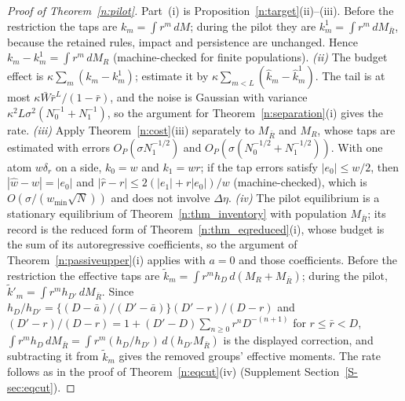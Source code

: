 \documentclass[11pt,letterpaper]{article}
\theoremstyle{definition}
\begin{document}
\begin{proof}[Proof of Theorem~\ref{n:pilot}]
Part~(i) is Proposition~\ref{n:target}(ii)--(iii). Before the restriction the taps are $k_m = \int r^m\, dM$; during the pilot they are $k^1_m = \int r^m\, dM_{\bar R}$, because the retained rules, impact and persistence are unchanged. Hence $k_m - k^1_m = \int r^m\, dM_R$ (machine-checked for finite populations). \emph{(ii)} The budget effect is $\kappa \sum_m (k_m - k^1_m)$; estimate it by $\kappa \sum_{m < L} (\hat k_m - \hat k^1_m)$. The tail is at most $\kappa \bar W \bar r^L / (1 - \bar r)$, and the noise is Gaussian with variance $\kappa^2 L \sigma^2 (N_0^{-1} + N_1^{-1})$, so the argument for Theorem~\ref{n:separation}(i) gives the rate. \emph{(iii)} Apply Theorem~\ref{n:cost}(iii) separately to $M_{\bar R}$ and $M_R$, whose taps are estimated with errors $O_P(\sigma N_1^{-1/2})$ and $O_P(\sigma (N_0^{-1/2} + N_1^{-1/2}))$. With one atom $w\delta_r$ on a side, $k_0 = w$ and $k_1 = w r$; if the tap errors satisfy $|e_0| \le w/2$, then $|\hat w - w| = |e_0|$ and $|\hat r - r| \le 2(|e_1| + r|e_0|)/w$ (machine-checked), which is $O(\sigma/(w_{\min}\sqrt N))$ and does not involve $\Delta\eta$. \emph{(iv)} The pilot equilibrium is a stationary equilibrium of Theorem~\ref{n:thm_inventory} with population $M_{\bar R}$; its record is the reduced form of Theorem~\ref{n:thm_eqreduced}(i), whose budget is the sum of its autoregressive coefficients, so the argument of Theorem~\ref{n:passiveupper}(i) applies with $a = 0$ and those coefficients. Before the restriction the effective taps are $\tilde k_m = \int r^m h_D\, d(M_R + M_{\bar R})$; during the pilot, $\tilde k'_m = \int r^m h_{D'}\, dM_{\bar R}$. Since $h_D/h_{D'} = \{(D - \bar a)/(D' - \bar a)\}(D' - r)/(D - r)$ and $(D' - r)/(D - r) = 1 + (D' - D)\sum_{n \ge 0} r^n D^{-(n+1)}$ for $r \le \bar r < D$, $\int r^m h_D\, dM_{\bar R} = \int r^m (h_D/h_{D'})\, d(h_{D'} M_{\bar R})$ is the displayed correction, and subtracting it from $\tilde k_m$ gives the removed groups' effective moments. The rate follows as in the proof of Theorem~\ref{n:eqcut}(iv) (Supplement Section~\ref{S-sec:eqcut}).
\end{proof}
\end{document}
